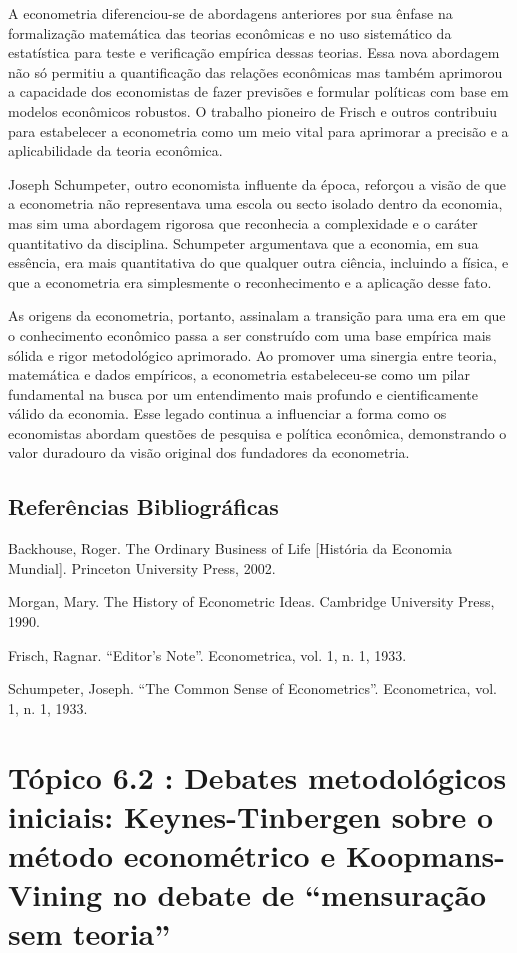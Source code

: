 \documentclass[a4paper,12pt]{article}[abntex2]
\begin{document}
A econometria diferenciou-se de abordagens anteriores por sua ênfase na formalização matemática das teorias econômicas e no uso sistemático da estatística para teste e verificação empírica dessas teorias. Essa nova abordagem não só permitiu a quantificação das relações econômicas mas também aprimorou a capacidade dos economistas de fazer previsões e formular políticas com base em modelos econômicos robustos. O trabalho pioneiro de Frisch e outros contribuiu para estabelecer a econometria como um meio vital para aprimorar a precisão e a aplicabilidade da teoria econômica.

Joseph Schumpeter, outro economista influente da época, reforçou a visão de que a econometria não representava uma escola ou secto isolado dentro da economia, mas sim uma abordagem rigorosa que reconhecia a complexidade e o caráter quantitativo da disciplina. Schumpeter argumentava que a economia, em sua essência, era mais quantitativa do que qualquer outra ciência, incluindo a física, e que a econometria era simplesmente o reconhecimento e a aplicação desse fato.

As origens da econometria, portanto, assinalam a transição para uma era em que o conhecimento econômico passa a ser construído com uma base empírica mais sólida e rigor metodológico aprimorado. Ao promover uma sinergia entre teoria, matemática e dados empíricos, a econometria estabeleceu-se como um pilar fundamental na busca por um entendimento mais profundo e cientificamente válido da economia. Esse legado continua a influenciar a forma como os economistas abordam questões de pesquisa e política econômica, demonstrando o valor duradouro da visão original dos fundadores da econometria.


\subsection{\textbf{Referências Bibliográficas}}
Backhouse, Roger. The Ordinary Business of Life [História da Economia Mundial]. Princeton
University Press, 2002.

Morgan, Mary. The History of Econometric Ideas. Cambridge University Press, 1990.

Frisch, Ragnar. “Editor’s Note”. Econometrica, vol. 1, n. 1, 1933.

Schumpeter, Joseph. “The Common Sense of Econometrics”. Econometrica, vol. 1, n. 1,
1933.

\newpage
\section{\textbf{Tópico 6.2 : Debates metodológicos iniciais: Keynes-Tinbergen sobre o método econométrico e Koopmans-Vining no debate de “mensuração sem teoria”}}
\end{document}
